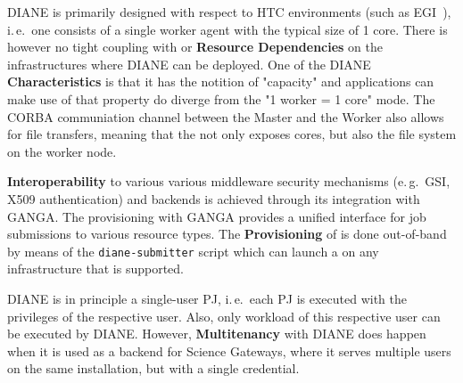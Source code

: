 \documentclass{sig-alternate}
\begin{document}
DIANE is primarily designed with respect to HTC environments (such as
EGI~\cite{egi}), i.\,e.\ one \pilot consists of a single worker agent with the
typical size of 1 core.
There is however no tight coupling with or \textbf{Resource Dependencies} on
the infrastructures where DIANE can be deployed.
One of the DIANE \pilot \textbf{Characteristics} is that it has the notition of
"capacity" and applications can make use of that property do diverge from the
"1 worker = 1 core" mode.
The CORBA communiation channel between the Master and the Worker also allows
for file transfers, meaning that the \pilot not only exposes cores, but also
the file system on the worker node.

\textbf{Interoperability} to various various middleware security mechanisms
(e.\,g.\ GSI, X509 authentication) and backends is achieved through its
integration with GANGA.
The \pilot provisioning with GANGA provides a unified interface for job
submissions to various resource types.
The \textbf{Provisioning} of \pilots is done out-of-band by means of the
\texttt{diane-submitter} script which can launch a \pilot on any infrastructure
that is supported.


DIANE is in principle a single-user PJ, i.\,e.\ each PJ is executed with the
privileges of the respective user.
Also, only workload of this respective user can be executed by DIANE.
However, \textbf{Multitenancy} with DIANE does happen when it is used as a
backend for Science Gateways, where it serves multiple users on the same
installation, but with a single credential.


\end{document}
